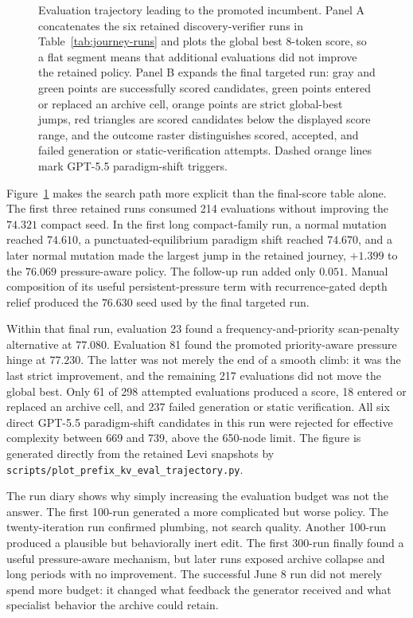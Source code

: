 \documentclass[11pt]{article}
\newcommand{\filepath}[1]{\nolinkurl{#1}}
\begin{document}
\begin{figure}[H]
\centering

\caption{Evaluation trajectory leading to the promoted incumbent.  Panel A concatenates
the six retained discovery-verifier runs in Table~\ref{tab:journey-runs} and plots the
global best 8-token score, so a flat segment means that additional evaluations did not
improve the retained policy.  Panel B expands the final targeted run: gray and green points are
successfully scored candidates, green points entered or replaced an archive cell,
orange points are strict global-best jumps, red triangles are scored candidates below
the displayed score range, and the outcome raster distinguishes scored, accepted, and
failed generation or static-verification attempts.  Dashed orange lines mark
GPT-5.5 paradigm-shift triggers.}
\label{fig:incumbent-eval-trajectory}
\end{figure}

Figure~\ref{fig:incumbent-eval-trajectory} makes the search path more explicit than the
final-score table alone.  The first three retained runs consumed 214 evaluations
without improving the \(74.321\) compact seed.  In the first long compact-family run,
a normal mutation reached \(74.610\), a punctuated-equilibrium paradigm shift reached
\(74.670\), and a later normal mutation made the largest jump in the retained journey,
\(+1.399\) to the \(76.069\) pressure-aware policy.  The follow-up run added only
\(0.051\).  Manual composition of its useful persistent-pressure term with
recurrence-gated depth relief produced the \(76.630\) seed used by the final targeted
run.

Within that final run, evaluation 23 found a frequency-and-priority scan-penalty
alternative at \(77.080\).  Evaluation 81 found the promoted priority-aware pressure
hinge at \(77.230\).  The latter was not merely the end of a smooth climb: it was the
last strict improvement, and the remaining 217 evaluations did not move the global
best.  Only 61 of 298 attempted evaluations produced a score, 18 entered or replaced
an archive cell, and 237 failed generation or static verification.  All six direct
GPT-5.5 paradigm-shift candidates in this run were rejected for effective complexity
between 669 and 739, above the 650-node limit.  The figure is generated directly from
the retained Levi snapshots by
\filepath{scripts/plot_prefix_kv_eval_trajectory.py}.

The run diary shows why simply increasing the evaluation budget was not the answer.
The first 100-run generated a more complicated but worse policy.  The twenty-iteration
run confirmed plumbing, not search quality.  Another 100-run produced a plausible but
behaviorally inert edit.  The first 300-run finally found a useful pressure-aware
mechanism, but later runs exposed archive collapse and long periods with no
improvement.  The successful June 8 run did not merely spend more budget: it changed
what feedback the generator received and what specialist behavior the archive could
retain.
\end{document}
